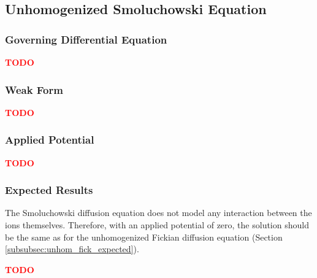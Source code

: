 
\subsection{Unhomogenized Smoluchowski Equation}\label{subsec:unhom_smol}

\subsubsection{Governing Differential Equation}\label{subsubsec:unhom_smol_gov}

\textcolor{red}{\textbf{TODO}}

\subsubsection{Weak Form}\label{subsubsec:unhom_smol_weak}

\textcolor{red}{\textbf{TODO}}

\subsubsection{Applied Potential}\label{subsubsec:unhom_smol_potential}

\textcolor{red}{\textbf{TODO}}

\subsubsection{Expected Results}\label{subsubsec:unhom_smol_expected}

The Smoluchowski diffusion equation does not model any interaction between the ions themselves.
Therefore, with an applied potential of zero,
the solution should be the same as for the
unhomogenized Fickian diffusion equation (Section \ref{subsubsec:unhom_fick_expected}).

\textcolor{red}{\textbf{TODO}}

